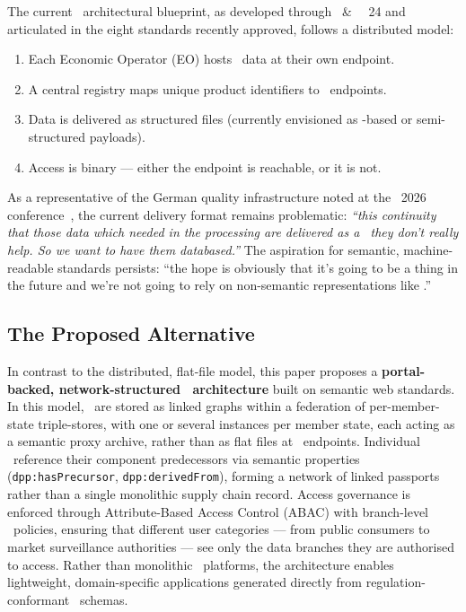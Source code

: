 The current \DPP\ architectural blueprint, as developed through \CEN\ \&
\CENELEC\ \JTC~24 and articulated in the eight standards recently approved,
follows a distributed model:

\begin{enumerate}
    \item Each Economic Operator (EO) hosts \DPP\ data at their own endpoint.
    \item A central registry maps unique product identifiers to \EO\ endpoints.
    \item Data is delivered as structured files (currently envisioned as
    \PDF-based or
    semi-structured payloads).
    \item Access is binary --- either the endpoint is reachable, or it is not.
\end{enumerate}

As a representative of the German quality infrastructure noted at the
\DPPforEU~2026 conference~\cite{dpp4eu2026_day1}, the current delivery format
remains problematic: \emph{``this continuity that those data which needed in the
processing are delivered as a \PDF\ they don't really help. So we want to have
them databased.''} The aspiration for semantic, machine-readable standards
persists: ``the hope is obviously that it's going to be a thing in the future
and we're not going to rely on non-semantic representations like \PDF.''

\subsection{The Proposed Alternative}

In contrast to the distributed, flat-file model, this paper proposes a
\textbf{por\-tal-backed, network-structured \DPP\ architecture} built on
semantic web standards. In this model, \DPPs\ are stored as linked graphs within
a federation of per-member-state triple-stores, with one or several instances
per member state, each acting as a semantic proxy archive, rather than as flat
files at \EO\ endpoints. Individual \DPPs\
reference their component predecessors via semantic properties
(\texttt{dpp:hasPrecursor}, \texttt{dpp:derivedFrom}), forming a network of
linked passports rather than a single monolithic supply chain record. Access
governance is enforced through Attribute-Based Access Control (ABAC) with
branch-level \ODRL\ policies, ensuring that different user categories --- from
public consumers to market surveillance authorities --- see only the data
branches they are authorised to access. Rather than monolithic \DPP\ platforms,
the architecture enables lightweight, domain-specific applications generated
directly from regulation-conformant \SHACL\ schemas.

